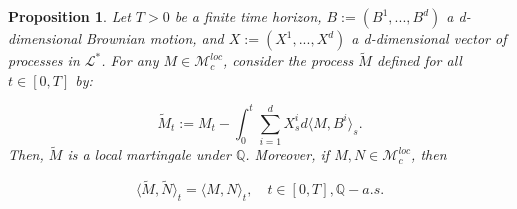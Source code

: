 \documentclass{article}
\newtheorem{prop}{Proposition}
\begin{document}
\begin{prop} \label{prop:girsanov}
Let $T>0$ be a finite time horizon, $B:=(B^1,...,B^d)$ a d-dimensional Brownian motion, and $X:=(X^1,...,X^d)$ a d-dimensional vector of processes in $\mathcal{L}^*$. For any $M\in\mathcal{M}^{loc}_c$, consider the process $\tilde{M}$ defined for all $t\in[0,T]$ by:

\begin{equation}
\tilde{M}_t:=M_t-\int^t_0\sum^d_{i=1}X_s^id\langle M,B^i\rangle_s.
\end{equation}
Then, $\tilde{M}$ is a local martingale under $\mathbb{Q}$. Moreover, if $M,N\in\mathcal{M}^{loc}_c$, then

\begin{equation}
\langle\tilde{M},\tilde{N}\rangle_t=\langle M,N\rangle_t, \quad t\in[0,T], \mathbb{Q}-a.s.
\end{equation}
\end{prop}
\end{document}
